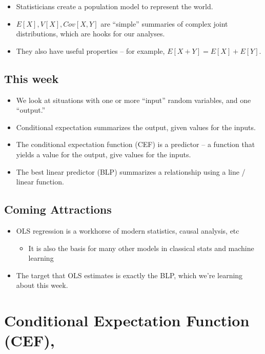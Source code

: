 \documentclass[
  letterpaper,
  DIV=11,
  numbers=noendperiod]{scrreprt}
\providecommand{\tightlist}{%
  \setlength{\itemsep}{0pt}\setlength{\parskip}{0pt}}\usepackage{longtable,booktabs,array}
\begin{document}
\begin{itemize}
\tightlist
\item
  Statisticians create a population model to represent the world.
\item
  \(E[X], V[X], Cov[X,Y]\) are ``simple'' summaries of complex joint
  distributions, which are hooks for our analyses.
\item
  They also have useful properties -- for example,
  \(E[X + Y] = E[X] + E[Y]\).
\end{itemize}

\subsection{This week}\label{this-week}

\begin{itemize}
\tightlist
\item
  We look at situations with one or more ``input'' random variables, and
  one ``output.''
\item
  Conditional expectation summarizes the output, given values for the
  inputs.
\item
  The conditional expectation function (CEF) is a predictor -- a
  function that yields a value for the output, give values for the
  inputs.
\item
  The best linear predictor (BLP) summarizes a relationship using a line
  / linear function.
\end{itemize}

\subsection{Coming Attractions}\label{coming-attractions}

\begin{itemize}
\tightlist
\item
  OLS regression is a workhorse of modern statistics, causal analysis,
  etc

  \begin{itemize}
  \tightlist
  \item
    It is also the basis for many other models in classical stats and
    machine learning
  \end{itemize}
\item
  The target that OLS estimates is exactly the BLP, which we're learning
  about this week.
\end{itemize}

\section{Conditional Expectation Function
(CEF),}\label{conditional-expectation-function-cef}
\end{document}

